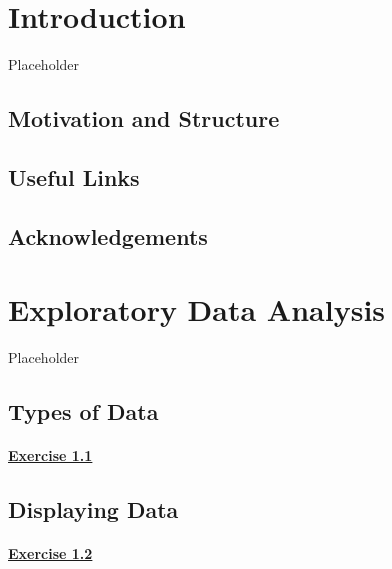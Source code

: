 \documentclass[
  11pt,
]{book}
\author{}
\date{\vspace{-2.5em}}
\begin{document}
{
\setcounter{tocdepth}{1}
\tableofcontents
}
\chapter*{Introduction}\label{introduction}

Placeholder

\section*{Motivation and Structure}\label{motivation-and-structure}

\section*{Useful Links}\label{useful-links}

\section*{Acknowledgements}\label{acknowledgements}

\chapter{Exploratory Data Analysis}\label{exploratory-data-analysis}

Placeholder

\section{Types of Data}\label{types-of-data}

\subsubsection*{\texorpdfstring{\hyperref[ex11a]{Exercise 1.1}}{Exercise 1.1}}\label{exercise-1.1}

\section{Displaying Data}\label{displaying-data}

\subsubsection*{\texorpdfstring{\hyperref[ex12a]{Exercise 1.2}}{Exercise 1.2}}\label{exercise-1.2}
\end{document}
